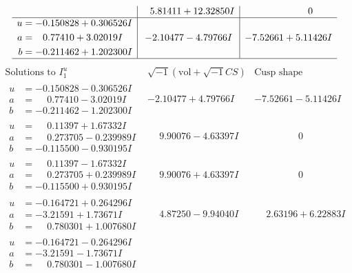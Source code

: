 \documentclass[1p]{elsarticle_modified}
\theoremstyle{definition}
\newcommand{\I}{\sqrt{-1}}
\begin{document}
$$\begin{array}{c|c|c}
 & \phantom{-}5.81411 + 12.32850 I & \phantom{-0.000000 } 0 \\ \hline\begin{aligned}
u &= -0.150828 + 0.306526 I \\
a &= \phantom{-}0.77410 + 3.02019 I \\
b &= -0.211462 + 1.202300 I\end{aligned}
 & -2.10477 - 4.79766 I & -7.52661 + 5.11426 I\\
 \hline 
 \end{array}$$\newpage$$\begin{array}{c|c|c}  
\text{Solutions to }I^u_{1}& \I (\text{vol} + \sqrt{-1}CS) & \text{Cusp shape}\\
 \hline 
\begin{aligned}
u &= -0.150828 - 0.306526 I \\
a &= \phantom{-}0.77410 - 3.02019 I \\
b &= -0.211462 - 1.202300 I\end{aligned}
 & -2.10477 + 4.79766 I & -7.52661 - 5.11426 I \\ \hline\begin{aligned}
u &= \phantom{-}0.11397 + 1.67332 I \\
a &= \phantom{-}0.273705 - 0.239989 I \\
b &= -0.115500 - 0.930195 I\end{aligned}
 & \phantom{-}9.90076 - 4.63397 I & \phantom{-0.000000 } 0 \\ \hline\begin{aligned}
u &= \phantom{-}0.11397 - 1.67332 I \\
a &= \phantom{-}0.273705 + 0.239989 I \\
b &= -0.115500 + 0.930195 I\end{aligned}
 & \phantom{-}9.90076 + 4.63397 I & \phantom{-0.000000 } 0 \\ \hline\begin{aligned}
u &= -0.164721 + 0.264296 I \\
a &= -3.21591 + 1.73671 I \\
b &= \phantom{-}0.780301 + 1.007680 I\end{aligned}
 & \phantom{-}4.87250 - 9.94040 I & \phantom{-}2.63196 + 6.22883 I \\ \hline\begin{aligned}
u &= -0.164721 - 0.264296 I \\
a &= -3.21591 - 1.73671 I \\
b &= \phantom{-}0.780301 - 1.007680 I\end{aligned}

\end{array}$$
\end{document}
